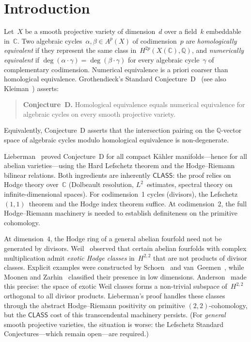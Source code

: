 \documentclass[11pt]{article}
\theoremstyle{plain}
\theoremstyle{definition}
\theoremstyle{remark}
\newcommand{\Q}{\mathbb{Q}}
\newcommand{\C}{\mathbb{C}}
\newcommand{\CLASS}{\mathsf{CLASS}}
\begin{document}
\section{Introduction}
\label{sec:intro}

Let~$X$ be a smooth projective variety of dimension~$d$ over a field~$k$
embeddable in~$\C$.  Two algebraic cycles~$\alpha, \beta \in A^p(X)$
of codimension~$p$ are \emph{homologically equivalent} if they represent the
same class in~$H^{2p}(X(\C),\Q)$, and \emph{numerically equivalent} if
$\deg(\alpha \cdot \gamma) = \deg(\beta \cdot \gamma)$ for every algebraic
cycle~$\gamma$ of complementary codimension.  Numerical equivalence is
a priori coarser than homological equivalence.  Grothendieck's Standard
Conjecture~D~\cite{grothendieck1969} (see also Kleiman~\cite{kleiman1968})
asserts:

\begin{quote}
\textbf{Conjecture~D.}
Homological equivalence equals numerical equivalence for algebraic cycles
on every smooth projective variety.
\end{quote}

Equivalently, Conjecture~D asserts that the intersection pairing on the
$\Q$-vector space of algebraic cycles modulo homological equivalence is
non-degenerate.

Lieberman~\cite{lieberman1968} proved Conjecture~D for all compact K\"ahler
manifolds---hence for all abelian varieties---using the Hard Lefschetz theorem
and the Hodge--Riemann bilinear relations.  Both ingredients are inherently
$\CLASS$: the proof relies on Hodge theory over~$\C$ (Dolbeault resolution,
$L^2$~estimates, spectral theory on infinite-dimensional spaces).  For
codimension~1 cycles (divisors), the Lefschetz $(1,1)$~theorem and the
Hodge index theorem suffice.  At codimension~2, the full Hodge--Riemann
machinery is needed to establish definiteness on the primitive cohomology.

At dimension~$4$, the Hodge ring of a general abelian fourfold need not be
generated by divisors.  Weil~\cite{weil1977} observed that certain abelian
fourfolds with complex multiplication admit \emph{exotic Hodge classes}
in~$H^{2,2}$ that are not products of divisor classes.  Explicit examples
were constructed by Schoen~\cite{schoen1988} and
van~Geemen~\cite{vangeemen2005}, while Moonen and
Zarhin~\cite{moonen-zarhin2000} classified their presence in low
dimensions.  Anderson~\cite{anderson1993} made this precise: the space of
exotic Weil classes forms a non-trivial subspace of~$H^{2,2}$ orthogonal
to all divisor products.  Lieberman's proof handles these classes through
the abstract Hodge--Riemann positivity on primitive $(2,2)$-cohomology,
but the $\CLASS$ cost of this transcendental machinery persists.  (For
\emph{general} smooth projective varieties, the situation is worse: the
Lefschetz Standard Conjectures---which remain open---are required.)
\end{document}
